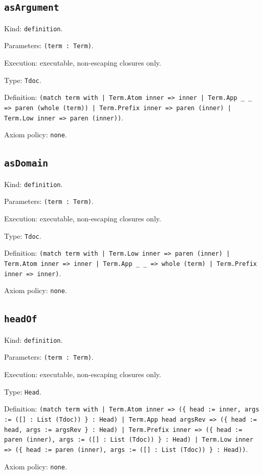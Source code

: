 \documentclass[11pt]{article}
\begin{document}
\subsection*{\texttt{asArgument}}
\noindent Kind: \texttt{definition}.\par
\noindent Parameters: \texttt{(term : Term)}.\par
\noindent Execution: executable, non-escaping closures only.\par
\noindent Type: \texttt{Tdoc}.\par
\noindent Definition: \texttt{(match term with | Term.Atom inner => inner | Term.App \_ \_ => paren (whole (term)) | Term.Prefix inner => paren (inner) | Term.Low inner => paren (inner))}.\par
\noindent Axiom policy: \texttt{none}.\par
\subsection*{\texttt{asDomain}}
\noindent Kind: \texttt{definition}.\par
\noindent Parameters: \texttt{(term : Term)}.\par
\noindent Execution: executable, non-escaping closures only.\par
\noindent Type: \texttt{Tdoc}.\par
\noindent Definition: \texttt{(match term with | Term.Low inner => paren (inner) | Term.Atom inner => inner | Term.App \_ \_ => whole (term) | Term.Prefix inner => inner)}.\par
\noindent Axiom policy: \texttt{none}.\par
\subsection*{\texttt{headOf}}
\noindent Kind: \texttt{definition}.\par
\noindent Parameters: \texttt{(term : Term)}.\par
\noindent Execution: executable, non-escaping closures only.\par
\noindent Type: \texttt{Head}.\par
\noindent Definition: \texttt{(match term with | Term.Atom inner => (\{ head := inner, args := ([] : List (Tdoc)) \} : Head) | Term.App head argsRev => (\{ head := head, args := argsRev \} : Head) | Term.Prefix inner => (\{ head := paren (inner), args := ([] : List (Tdoc)) \} : Head) | Term.Low inner => (\{ head := paren (inner), args := ([] : List (Tdoc)) \} : Head))}.\par
\noindent Axiom policy: \texttt{none}.\par
\end{document}
